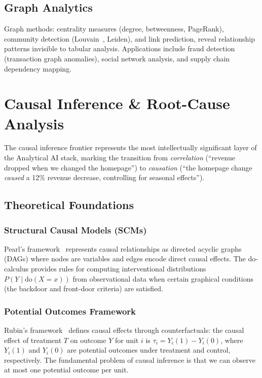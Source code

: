 \documentclass[12pt, a4paper]{article}
\begin{document}
\subsection{Graph Analytics}
Graph methods: centrality measures (degree, betweenness, PageRank), community detection (Louvain~\citep{blondel2008louvain}, Leiden), and link prediction, reveal relationship patterns invisible to tabular analysis. Applications include fraud detection (transaction graph anomalies), social network analysis, and supply chain dependency mapping.

\section{Causal Inference \& Root-Cause Analysis}\label{sec:causal}

The causal inference frontier represents the most intellectually significant layer of the Analytical AI stack, marking the transition from \emph{correlation} (``revenue dropped when we changed the homepage'') to \emph{causation} (``the homepage change \emph{caused} a 12\% revenue decrease, controlling for seasonal effects'').

\subsection{Theoretical Foundations}

\subsubsection{Structural Causal Models (SCMs)}
Pearl's framework~\citep{pearl2009causality} represents causal relationships as directed acyclic graphs (DAGs) where nodes are variables and edges encode direct causal effects. The do-calculus provides rules for computing interventional distributions $P(Y \mid \text{do}(X=x))$ from observational data when certain graphical conditions (the backdoor and front-door criteria) are satisfied.

\subsubsection{Potential Outcomes Framework}
Rubin's framework~\citep{rubin2005causal} defines causal effects through counterfactuals: the causal effect of treatment $T$ on outcome $Y$ for unit $i$ is $\tau_i = Y_i(1) - Y_i(0)$, where $Y_i(1)$ and $Y_i(0)$ are potential outcomes under treatment and control, respectively. The fundamental problem of causal inference is that we can observe at most one potential outcome per unit.
\end{document}
